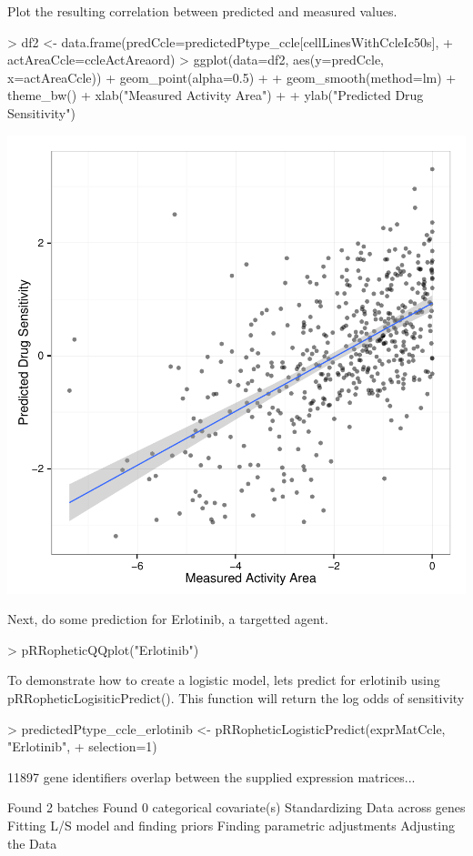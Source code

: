 \documentclass[a4paper]{article}
\begin{document}
Plot the resulting correlation between predicted and measured values.
\begin{Schunk}
\begin{Sinput}
> df2 <- data.frame(predCcle=predictedPtype_ccle[cellLinesWithCcleIc50s], 
+ actAreaCcle=ccleActAreaord)
> ggplot(data=df2, aes(y=predCcle, x=actAreaCcle)) + geom_point(alpha=0.5) + 
+ geom_smooth(method=lm) + theme_bw() + xlab("Measured Activity Area") +
+ ylab("Predicted Drug Sensitivity")
\end{Sinput}
\end{Schunk}
\includegraphics{vignetteOutline-015}

Next, do some prediction for Erlotinib, a targetted agent.
\begin{Schunk}
\begin{Sinput}
> pRRopheticQQplot("Erlotinib")
\end{Sinput}
\end{Schunk}

To demonstrate how to create a logistic model, lets predict for erlotinib using pRRopheticLogisiticPredict(). This function will return the log odds of sensitivity
\begin{Schunk}
\begin{Sinput}
> predictedPtype_ccle_erlotinib <- pRRopheticLogisticPredict(exprMatCcle, "Erlotinib",
+ selection=1)
\end{Sinput}
\begin{Soutput}
 11897  gene identifiers overlap between the supplied expression matrices... 
 
Found 2 batches
Found 0  categorical covariate(s)
Standardizing Data across genes
Fitting L/S model and finding priors
Finding parametric adjustments
Adjusting the Data
\end{Soutput}
\end{Schunk}
\end{document}

